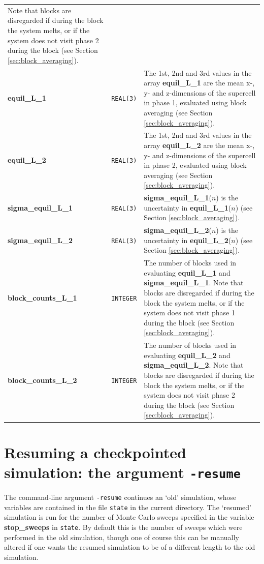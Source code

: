 \documentclass{report}
\begin{document}
\begin{landscape}
\begin{center}
\begin{longtable}{ l l p{8cm}}
Note that blocks are disregarded if during the block the system melts, or if the system does not visit phase 2 during the block (see Section \ref{sec:block_averaging}). \\
\textbf{equil\_L\_1} & \texttt{REAL(3)} & The 1st, 2nd and 3rd values in the array \textbf{equil\_L\_1} are the mean x-, y- and z-dimensions of the
supercell in phase 1, evaluated using block averaging (see Section \ref{sec:block_averaging}). \\
\textbf{equil\_L\_2} & \texttt{REAL(3)} &  The 1st, 2nd and 3rd values in the array \textbf{equil\_L\_2} are the mean x-, y- and z-dimensions of the
supercell in phase 2, evaluated using block averaging (see Section \ref{sec:block_averaging}). \\
\textbf{sigma\_equil\_L\_1} & \texttt{REAL(3)} & \textbf{sigma\_equil\_L\_1}($n$) is the uncertainty in \textbf{equil\_L\_1}($n$) (see Section \ref{sec:block_averaging}). \\
\textbf{sigma\_equil\_L\_2} & \texttt{REAL(3)} & \textbf{sigma\_equil\_L\_2}($n$) is the uncertainty in \textbf{equil\_L\_2}($n$) (see Section \ref{sec:block_averaging}). \\
\textbf{block\_counts\_L\_1} & \texttt{INTEGER} & The number of blocks used in evaluating \textbf{equil\_L\_1} and \textbf{sigma\_equil\_L\_1}. Note that blocks are
disregarded if during the block the system melts, or if the system does not visit phase 1 during the block  (see Section \ref{sec:block_averaging}). \\
\textbf{block\_counts\_L\_2} & \texttt{INTEGER} &  The number of blocks used in evaluating \textbf{equil\_L\_2} and \textbf{sigma\_equil\_L\_2}. Note that blocks are
disregarded if during the block the system melts, or if the system does not visit phase 2 during the block (see Section \ref{sec:block_averaging}). \\
\end{longtable}
\end{center}
\end{landscape}


\section{Resuming a checkpointed simulation: the argument \texttt{-resume}}\label{sec:resume}
The command-line argument \texttt{-resume} continues an `old' simulation, whose variables are contained in the file \texttt{state} in the current 
directory. The `resumed' simulation is run for the number of Monte Carlo sweeps specified in the variable \textbf{stop\_sweeps} in \texttt{state}.
By default this is the number of sweeps which were performed in the old simulation, though one of course this can be manually altered if one wants
the resumed simulation to be of a different length to the old simulation.
\end{document}
